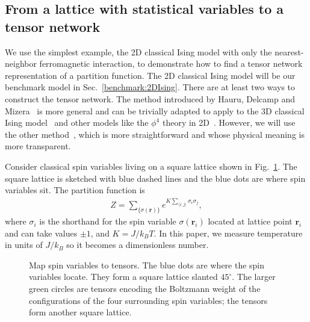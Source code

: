 \documentclass[aps,prb,reprint,superscriptaddress]{revtex4-2}
\begin{document}
\subsection{From a lattice with statistical variables to a tensor
network\label{spin2tensor}} We use the simplest example, the 2D
classical Ising model with only the nearest-neighbor ferromagnetic
interaction, to demonstrate how to find a tensor network representation
of a partition function. The 2D classical Ising model will be our
benchmark model in Sec.~\ref{benchmark:2DIsing}.  There are at least two
ways to construct the tensor network. The method introduced by Hauru,
Delcamp and Mizera~\cite{gilts} is more general and can be trivially
adapted to apply to the 3D classical Ising model~\cite{hotrg} and other
models like the $\phi^4$ theory in 2D~\cite{Delcamp2020}. However, we
will use the other method~\cite{trg, tnr}, which is more straightforward
and whose physical meaning is more transparent.
%

Consider classical spin variables living on a square lattice shown in
Fig.~\ref{fig:spin2tensor}. The square lattice is sketched with blue
dashed lines and the blue dots are where spin variables sit. The
partition function is
%
\begin{align}\label{eq:2DIsingZ} Z =
\sum_{\{\sigma(\mathbf{r})\}}e^{K\sum_{\langle i,j \rangle}\sigma_i
\sigma_j}, \end{align} where $\sigma_i$ is the shorthand for the spin
variable $\sigma(\mathbf{r}_i)$ located at lattice point $\mathbf{r}_i$
and can take values $\pm 1$, and $K = J / k_B T$. In this paper, we
measure temperature in units of $J / k_B $ so it becomes a dimensionless
number.
\begin{figure}[htb]
    \caption{\label{fig:spin2tensor}Map spin variables to tensors.  The
        blue dots are where the spin variables locate. They form a
        square lattice slanted $45^\circ$. The larger green circles are
        tensors encoding the Boltzmann weight of the configurations of
the four surrounding spin variables; the tensors form another square
lattice.} \end{figure}
%
\end{document}
